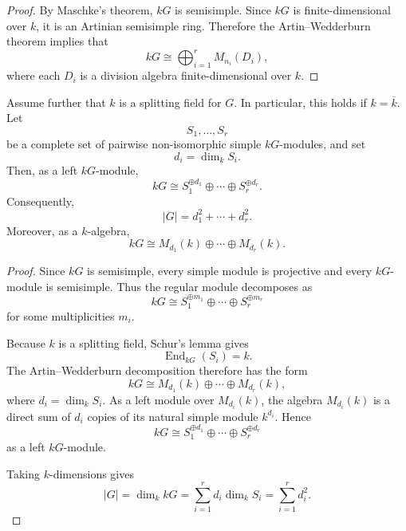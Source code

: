 \begin{proof}
    By Maschke's theorem, \(kG\) is semisimple. Since \(kG\) is finite-dimensional
    over \(k\), it is an Artinian semisimple ring. Therefore the Artin--Wedderburn
    theorem implies that
    \[
        kG
        \cong
        \bigoplus_{i=1}^r M_{n_i}(D_i),
    \]
    where each \(D_i\) is a division algebra finite-dimensional over \(k\).
\end{proof}

\begin{theorem}
    Assume further that \(k\) is a splitting field for \(G\). In particular, this
    holds if \(k=\overline{k}\). Let
    \[
        S_1,\dots,S_r
    \]
    be a complete set of pairwise non-isomorphic simple \(kG\)-modules, and set
    \[
        d_i=\dim_k S_i.
    \]
    Then, as a left \(kG\)-module,
    \[
        kG
        \cong
        S_1^{\oplus d_1}
        \oplus
        \cdots
        \oplus
        S_r^{\oplus d_r}.
    \]
    Consequently,
    \[
        |G|
        =
        d_1^2+\cdots+d_r^2.
    \]
    Moreover, as a \(k\)-algebra,
    \[
        kG
        \cong
        M_{d_1}(k)
        \oplus
        \cdots
        \oplus
        M_{d_r}(k).
    \]
\end{theorem}

\begin{proof}
    Since \(kG\) is semisimple, every simple module is projective and every
    \(kG\)-module is semisimple. Thus the regular module decomposes as
    \[
        kG
        \cong
        S_1^{\oplus m_1}
        \oplus
        \cdots
        \oplus
        S_r^{\oplus m_r}
    \]
    for some multiplicities \(m_i\).

    Because \(k\) is a splitting field, Schur's lemma gives
    \[
        \operatorname{End}_{kG}(S_i)=k.
    \]
    The Artin--Wedderburn decomposition therefore has the form
    \[
        kG
        \cong
        M_{d_1}(k)\oplus\cdots\oplus M_{d_r}(k),
    \]
    where \(d_i=\dim_k S_i\). As a left module over \(M_{d_i}(k)\), the algebra
    \(M_{d_i}(k)\) is a direct sum of \(d_i\) copies of its natural simple module
    \(k^{d_i}\). Hence
    \[
        kG
        \cong
        S_1^{\oplus d_1}
        \oplus
        \cdots
        \oplus
        S_r^{\oplus d_r}
    \]
    as a left \(kG\)-module.

    Taking \(k\)-dimensions gives
    \[
        |G|
        =
        \dim_k kG
        =
        \sum_{i=1}^r d_i\dim_k S_i
        =
        \sum_{i=1}^r d_i^2.
    \]
\end{proof}
